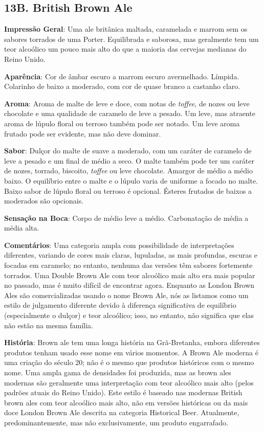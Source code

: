 \subsection*{13B. British Brown Ale}
\textbf{Impressão Geral}: Uma ale britânica maltada, caramelada e marrom sem os sabores torrados de uma Porter. Equilibrada e saborosa, mas geralmente tem um teor alcoólico um pouco mais alto do que a maioria das cervejas medianas do Reino Unido.

\textbf{Aparência}: Cor de âmbar escuro a marrom escuro avermelhado. Límpida. Colarinho de baixo a moderado, com cor de quase branco a castanho claro.

\textbf{Aroma}: Aroma de malte de leve e doce, com notas de \textit{toffee}, de nozes ou leve chocolate e uma qualidade de caramelo de leve a pesado. Um leve, mas atraente aroma de lúpulo floral ou terroso também pode ser notado. Um leve aroma frutado pode ser evidente, mas não deve dominar.

\textbf{Sabor}: Dulçor do malte de suave a moderado, com um caráter de caramelo de leve a pesado e um final de médio a seco. O malte também pode ter um caráter de nozes, torrado, biscoito, \textit{toffee} ou leve chocolate. Amargor de médio a médio baixo. O equilíbrio entre o malte e o lúpulo varia de uniforme a focado no malte. Baixo sabor de lúpulo floral ou terroso é opcional. Ésteres frutados de baixos a moderados são opcionais.

\textbf{Sensação na Boca}: Corpo de médio leve a médio. Carbonatação de média a média alta.

\textbf{Comentários}: Uma categoria ampla com possibilidade de interpretações diferentes, variando de cores mais claras, lupuladas, as mais profundas, escuras e focadas em caramelo; no entanto, nenhuma das versões têm sabores fortemente torrados. Uma Double Brown Ale com teor alcoólico mais alto era mais popular no passado, mas é muito difícil de encontrar agora. Enquanto as London Brown Ales são comercializadas usando o nome Brown Ale, nós as listamos como um estilo de julgamento diferente devido à diferença significativa de equilíbrio (especialmente o dulçor) e teor alcoólico; isso, no entanto, não significa que elas não estão na mesma família.

\textbf{História}: Brown ale tem uma longa história na Grã-Bretanha, embora diferentes produtos tenham usado esse nome em vários momentos. A Brown Ale moderna é uma criação do século 20; não é o mesmo que produtos históricos com o mesmo nome. Uma ampla gama de densidades foi produzida, mas as brown ales modernas são geralmente uma interpretação com teor alcoólico mais alto (pelos padrões atuais do Reino Unido). Este estilo é baseado nas modernas British brown ales com teor alcoólico mais alto, não em versões históricas ou da mais doce London Brown Ale descrita na categoria Historical Beer. Atualmente, predominantemente, mas não exclusivamente, um produto engarrafado.

